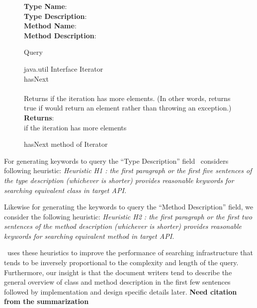 \begin{figure}
	\begin{framed}	
		\textbf{Type Name}: \\
		\textbf{Type Description}: \\
		\textbf{Method Name}: \\
		\textbf{Method Description}: 
	\end{framed}
	\caption{Query}
	\label{fig:hasNextJavaQuery}
\end{figure}


\begin{figure}
	\begin{framed}
		{\small java.util} Interface Iterator\\
		{\LARGE hasNext}\\
		\CodeIn{boolean hasNext()}\\
		Returns  if the iteration has more elements. (In other words, returns true if  would return an element rather than throwing an exception.)\\
		\textbf{Returns}:\\
		 if the iteration has more elements
	\end{framed}
	\caption{hasNext method of Iterator}
	\label{fig:hasNextJavadoc}
\end{figure}


For generating keywords to query the ``Type Description'' field \tool\ considers following heuristic:
\textit{Heuristic H1 :  the first paragraph or the first five sentences of the type description (whichever is shorter) provides reasonable keywords for searching equivalent class in target API.} 

Likewise for generating the keywords to query the ``Method Description'' field, we consider the following heuristic: \textit{Heuristic H2 : the first paragraph or the first two sentences of the method description (whichever is shorter) provides reasonable keywords for searching equivalent method in target API.}

\tool\ uses these heuristics to improve the performance of searching infrastructure
that tends to be inversely proportional to the complexity and length of the query.
Furthermore, our insight is that the document writers tend to describe the general
overview of class and method description in the first few sentences followed by implementation and design specific
details later. \textbf{Need citation from the summarization}


